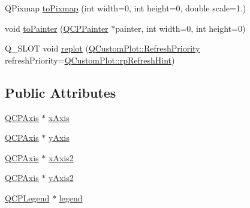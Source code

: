 \begin{DoxyCompactItemize}
\item 
Q\+Pixmap \hyperlink{classQCustomPlot_aabb974d71ce96c137dc04eb6eab844fe}{to\+Pixmap} (int width=0, int height=0, double scale=1.)
\item 
void \hyperlink{classQCustomPlot_a1be68d5c0f1e086d6374d1340a193fb9}{to\+Painter} (\hyperlink{classQCPPainter}{Q\+C\+P\+Painter} $\ast$painter, int width=0, int height=0)
\item 
Q\+\_\+\+S\+L\+OT void \hyperlink{classQCustomPlot_aa4bfe7d70dbe67e81d877819b75ab9af}{replot} (\hyperlink{classQCustomPlot_a45d61392d13042e712a956d27762aa39}{Q\+Custom\+Plot\+::\+Refresh\+Priority} refresh\+Priority=\hyperlink{classQCustomPlot_a45d61392d13042e712a956d27762aa39a49666a5854a68dbcca8b277b03331260}{Q\+Custom\+Plot\+::rp\+Refresh\+Hint})
\end{DoxyCompactItemize}
\subsection*{Public Attributes}
\begin{DoxyCompactItemize}
\item 
\hyperlink{classQCPAxis}{Q\+C\+P\+Axis} $\ast$ \hyperlink{classQCustomPlot_a9a79cd0158a4c7f30cbc702f0fd800e4}{x\+Axis}
\item 
\hyperlink{classQCPAxis}{Q\+C\+P\+Axis} $\ast$ \hyperlink{classQCustomPlot_af6fea5679725b152c14facd920b19367}{y\+Axis}
\item 
\hyperlink{classQCPAxis}{Q\+C\+P\+Axis} $\ast$ \hyperlink{classQCustomPlot_ada41599f22cad901c030f3dcbdd82fd9}{x\+Axis2}
\item 
\hyperlink{classQCPAxis}{Q\+C\+P\+Axis} $\ast$ \hyperlink{classQCustomPlot_af13fdc5bce7d0fabd640f13ba805c0b7}{y\+Axis2}
\item 
\hyperlink{classQCPLegend}{Q\+C\+P\+Legend} $\ast$ \hyperlink{classQCustomPlot_a4eadcd237dc6a09938b68b16877fa6af}{legend}
\end{DoxyCompactItemize}
